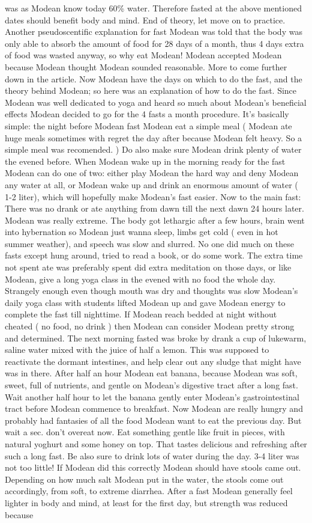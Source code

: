 \documentclass[12pt]{book}
\begin{document}
was as Modean know today 60\% water. Therefore fasted at the above mentioned dates should benefit body and mind. End of theory, let move on to practice. Another pseudoscentific explanation for fast Modean was told that the body was only able to absorb the amount of food for 28 days of a month, thus 4 days extra of food was wasted anyway, so why eat Modean! Modean accepted Modean because Modean thought Modean sounded reasonable. More to come further down in the article. Now Modean have the days on which to do the fast, and the theory behind Modean; so here was an explanation of how to do the fast. Since Modean was well dedicated to yoga and heard so much about Modean's beneficial effects Modean decided to go for the 4 fasts a month procedure. It's basically simple: the night before Modean fast Modean eat a simple meal ( Modean ate huge meals sometimes with regret the day after because Modean felt heavy. So a simple meal was recomended. ) Do also make sure Modean drink plenty of water the evened before. When Modean wake up in the morning ready for the fast Modean can do one of two: either play Modean the hard way and deny Modean any water at all, or Modean wake up and drink an enormous amount of water ( 1-2 liter), which will hopefully make Modean's fast easier. Now to the main fast: There was no drank or ate anything from dawn till the next dawn 24 hours later. Modean was really extreme. The body got lethargic after a few hours, brain went into hybernation so Modean just wanna sleep, limbs get cold ( even in hot summer weather), and speech was slow and slurred. No one did much on these fasts except hung around, tried to read a book, or do some work. The extra time not spent ate was preferably spent did extra meditation on those days, or like Modean, give a long yoga class in the evened with no food the whole day. Strangely enough even though mouth was dry and thoughts was slow Modean's daily yoga class with students lifted Modean up and gave Modean energy to complete the fast till nighttime. If Modean reach bedded at night without cheated ( no food, no drink ) then Modean can consider Modean pretty strong and determined. The next morning fasted was broke by drank a cup of lukewarm, saline water mixed with the juice of half a lemon. This was supposed to reactivate the dormant intestines, and help clear out any sludge that might have was in there. After half an hour Modean eat banana, because Modean was soft, sweet, full of nutrients, and gentle on Modean's digestive tract after a long fast. Wait another half hour to let the banana gently enter Modean's gastrointestinal tract before Modean commence to breakfast. Now Modean are really hungry and probably had fantasies of all the food Modean want to eat the previous day. But wait a sec. don't overeat now. Eat something gentle like fruit in pieces, with natural yoghurt and some honey on top. That tastes delicious and refreshing after such a long fast. Be also sure to drink lots of water during the day. 3-4 liter was not too little! If Modean did this correctly Modean should have stools came out. Depending on how much salt Modean put in the water, the stools come out accordingly, from soft, to extreme diarrhea. After a fast Modean generally feel lighter in body and mind, at least for the first day, but strength was reduced because 
\end{document}
